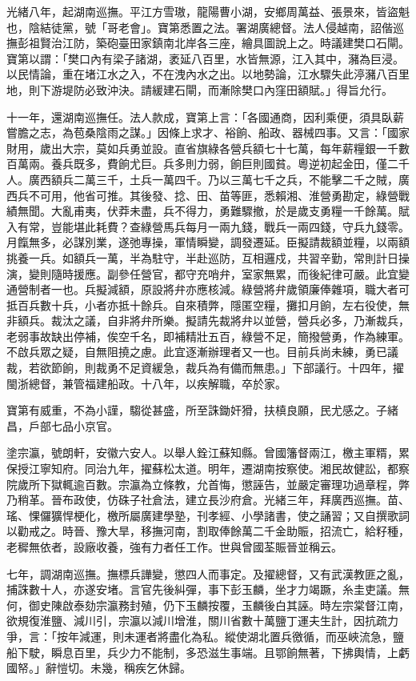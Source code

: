 \begin{pinyinscope}
光緒八年，起湖南巡撫。平江方雪璈，龍陽曹小湖，安鄉周萬益、張景來，皆盜魁也，陰結徒黨，號「哥老會」。寶第悉置之法。署湖廣總督。法人侵越南，詔偕巡撫彭祖賢治江防，築砲臺田家鎮南北岸各三座，繪具圖說上之。時議建樊口石閘。寶第以謂：「樊口內有梁子諸湖，袤延八百里，水皆無源，江入其中，瀦為巨浸。以民情論，重在堵江水之入，不在洩內水之出。以地勢論，江水驟失此渟瀦八百里地，則下游堤防必致沖決。請緩建石閘，而漸除樊口內窪田額賦。」得旨允行。

十一年，還湖南巡撫任。法人款成，寶第上言：「各國通商，因利乘便，須具臥薪嘗膽之志，為苞桑陰雨之謀。」因條上求才、裕餉、船政、器械四事。又言：「國家財用，歲出大宗，莫如兵勇並設。直省旗綠各營兵額七十七萬，每年薪糧銀一千數百萬兩。養兵既多，費餉尤巨。兵多則力弱，餉巨則國貧。粵逆初起金田，僅二千人。廣西額兵二萬三千，土兵一萬四千。乃以三萬七千之兵，不能擊二千之賊，廣西兵不可用，他省可推。其後發、捻、田、苗等匪，悉賴湘、淮營勇勘定，綠營戰績無聞。大亂甫夷，伏莽未盡，兵不得力，勇難驟撤，於是歲支勇糧一千餘萬。賦入有常，豈能堪此耗費？查綠營馬兵每月一兩九錢，戰兵一兩四錢，守兵九錢零。月餼無多，必謀別業，遂弛專操，軍情瞬變，調發遷延。臣擬請裁額並糧，以兩額挑養一兵。如額兵一萬，半為駐守，半赴巡防，互相邏戍，共習辛勤，常則計日操演，變則隨時援應。副參任營官，都守充哨弁，室家無累，而後紀律可嚴。此宜變通營制者一也。兵擬減額，原設將弁亦應核減。綠營將弁歲領廉俸雜項，職大者可抵百兵數十兵，小者亦抵十餘兵。自來積弊，隱匿空糧，攤扣月餉，左右役使，無非額兵。裁汰之議，自非將弁所樂。擬請先裁將弁以並營，營兵必多，乃漸裁兵，老弱事故缺出停補，俟空千名，即補精壯五百，綠營不足，簡撥營勇，作為練軍。不啟兵眾之疑，自無阻撓之慮。此宜逐漸辦理者又一也。目前兵尚未練，勇已議裁，若欲節餉，則裁勇不足資緩急，裁兵為有備而無患。」下部議行。十四年，擢閩浙總督，兼管福建船政。十八年，以疾解職，卒於家。

寶第有威重，不為小謹，騶從甚盛，所至誅鋤奸猾，扶槙良願，民尤感之。子緒昌，戶部七品小京官。

塗宗瀛，號朗軒，安徽六安人。以舉人銓江蘇知縣。曾國籓督兩江，檄主軍糈，累保授江寧知府。同治九年，擢蘇松太道。明年，遷湖南按察使。湘民故健訟，都察院歲所下獄輒逾百數。宗瀛為立條教，允首悔，懲誣告，並嚴定審理功過章程，弊乃稍革。晉布政使，仿硃子社倉法，建立長沙府倉。光緒三年，拜廣西巡撫。苗、瑤、惈儸獷悍梗化，檄所屬廣建學塾，刊孝經、小學諸書，使之誦習；又自撰歌詞以勸戒之。時晉、豫大旱，移撫河南，割取俸餘萬二千金助賑，招流亡，給籽種，老穉無依者，設廠收養，強有力者任工作。世與曾國荃賑晉並稱云。

七年，調湖南巡撫。撫標兵譁變，懲四人而事定。及擢總督，又有武漢教匪之亂，捕誅數十人，亦遂安堵。言官先後糾彈，事下彭玉麟，坐才力竭蹶，糸圭吏議。無何，御史陳啟泰劾宗瀛務封殖，仍下玉麟按覆，玉麟後白其誣。時左宗棠督江南，欲規復淮鹽、減川引，宗瀛以減川增淮，關川省數十萬鹽丁運夫生計，因抗疏力爭，言：「按年減運，則未運者將盡化為私。縱使湖北置兵徼循，而巫峽流急，鹽船下駛，瞬息百里，兵少力不能制，多恐滋生事端。且鄂餉無著，下拂輿情，上虧國帑。」辭愷切。未幾，稱疾乞休歸。


\end{pinyinscope}
